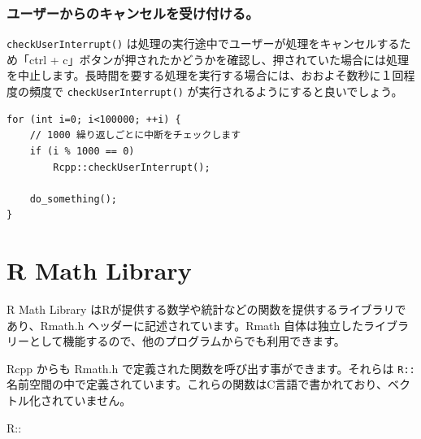 \documentclass[]{book}
\begin{document}
\subsection{ユーザーからのキャンセルを受け付ける。}

\texttt{checkUserInterrupt()} は処理の実行途中でユーザーが処理をキャンセルするため「ctrl + c」ボタンが押されたかどうかを確認し、押されていた場合には処理を中止します。長時間を要する処理を実行する場合には、おおよそ数秒に１回程度の頻度で \texttt{checkUserInterrupt()} が実行されるようにすると良いでしょう。

\begin{verbatim}
for (int i=0; i<100000; ++i) {
    // 1000 繰り返しごとに中断をチェックします
    if (i % 1000 == 0)
        Rcpp::checkUserInterrupt();

    do_something();
}
\end{verbatim}

\hypertarget{r-math-library}{%
\chapter{R Math Library}\label{r-math-library}}

R Math Library はRが提供する数学や統計などの関数を提供するライブラリであり、Rmath.h ヘッダーに記述されています。Rmath 自体は独立したライブラリーとして機能するので、他のプログラムからでも利用できます。

Rcpp からも Rmath.h で定義された関数を呼び出す事ができます。それらは \texttt{R::} 名前空間の中で定義されています。これらの関数はC言語で書かれており、ベクトル化されていません。

R::
\end{document}
